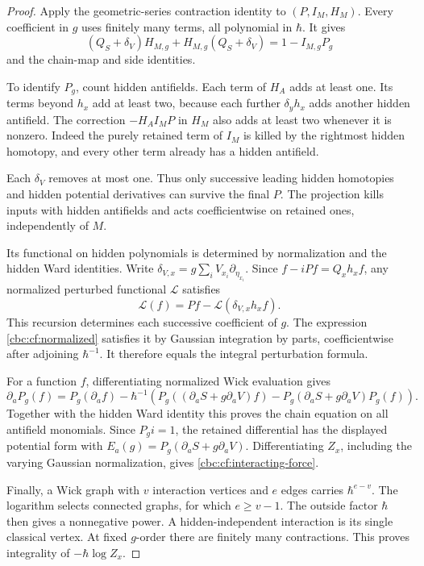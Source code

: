 \begin{proof}
Apply the geometric-series contraction identity to
$(P,I_M,H_M)$. Every coefficient in $g$ uses finitely many
terms, all polynomial in $\hbar$. It gives
\[
 (Q_S+\delta_V)H_{M,g}+H_{M,g}(Q_S+\delta_V)
       =1-I_{M,g}P_g
\]
and the chain-map and side identities.

To identify $P_g$, count hidden antifields.
Each term of $H_A$ adds at least one. Its terms beyond $h_x$
add at least two, because each further $\delta_yh_x$ adds
another hidden antifield. The correction $-H_AI_MP$ in $H_M$
also adds at least two whenever it is nonzero. Indeed the
purely retained term of $I_M$ is killed by the rightmost hidden
homotopy, and every other term already has a hidden antifield.

Each $\delta_V$ removes at most one. Thus only successive
leading hidden homotopies and hidden potential derivatives can
survive the final $P$.
The projection kills inputs with hidden antifields and acts
coefficientwise on retained ones, independently of $M$.

Its functional on hidden polynomials is determined by
normalization and the hidden Ward identities. Write
$\delta_{V,x}=g\sum_iV_{x_i}\partial_{\eta_{x_i}}$.
Since $f-iPf=Q_xh_xf$, any normalized perturbed functional
$\mathcal L$ satisfies
\[
 \mathcal L(f)=Pf-\mathcal L(\delta_{V,x}h_xf).
\]
This recursion determines each successive coefficient of $g$.
The expression \eqref{cbc:cf:normalized} satisfies it by
Gaussian integration by parts, coefficientwise after adjoining
$\hbar^{-1}$. It therefore equals the integral perturbation
formula.

For a function $f$, differentiating normalized Wick evaluation
gives
\[
 \partial_aP_g(f)=P_g(\partial_af)
 -\hbar^{-1}\left(
 P_g((\partial_aS+g\partial_aV)f)
 -P_g(\partial_aS+g\partial_aV)P_g(f)\right).
\]
Together with the hidden Ward identity this proves the chain
equation on all antifield monomials. Since $P_gi=1$, the
retained differential has the displayed potential form with
$E_a(g)=P_g(\partial_aS+g\partial_aV)$.
Differentiating $Z_x$, including the varying Gaussian
normalization, gives \eqref{cbc:cf:interacting-force}.

Finally, a Wick graph with $v$ interaction vertices and $e$
edges carries $\hbar^{e-v}$. The logarithm selects connected
graphs, for which $e\geq v-1$. The outside factor $\hbar$
then gives a nonnegative power. A hidden-independent interaction
is its single classical vertex. At fixed $g$-order there are
finitely many contractions. This proves integrality of
$-\hbar\log Z_x$.
\end{proof}

